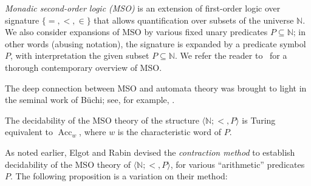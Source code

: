 \documentclass[a4paper,UKenglish,cleveref, autoref, thm-restate]{lipics-v2021}
\newcommand{\nat} {\mathbb{N}}
\newcommand{\Acc} {\operatorname{Acc}}
\begin{document}
\emph{Monadic second-order logic (MSO)} is an extension of first-order logic
over signature $\{=, <, \in\}$
that allows quantification over subsets of the universe $\nat$.
We also consider expansions of MSO by various fixed unary predicates
$P \subseteq \nat$; in other words (abusing notation), the signature is expanded by a predicate
symbol $P$, with interpretation the given subset $P \subseteq \nat$.
We refer the reader to~\cite{mso-notes} for a thorough contemporary overview of MSO\@.

The deep connection between MSO and automata theory was brought to
light in the seminal work of B\"uchi; see, for example, \cite[Thms.~5.4 and 5.9]{thomas1997languages}.

\begin{theorem}\label{thm : Buchi MSO char word}
    The decidability of the MSO theory of the structure $\langle \nat ; < , P \rangle$ is Turing equivalent to $\Acc_w$, where $w$ is the characteristic word of $P$.
\end{theorem}

As noted earlier, Elgot and Rabin devised the \emph{contraction
  method} to establish decidability of the MSO theory of
$\langle \nat ; < , P \rangle$, for various ``arithmetic'' predicates
$P$. The following proposition is a variation on their method:
\end{document}
